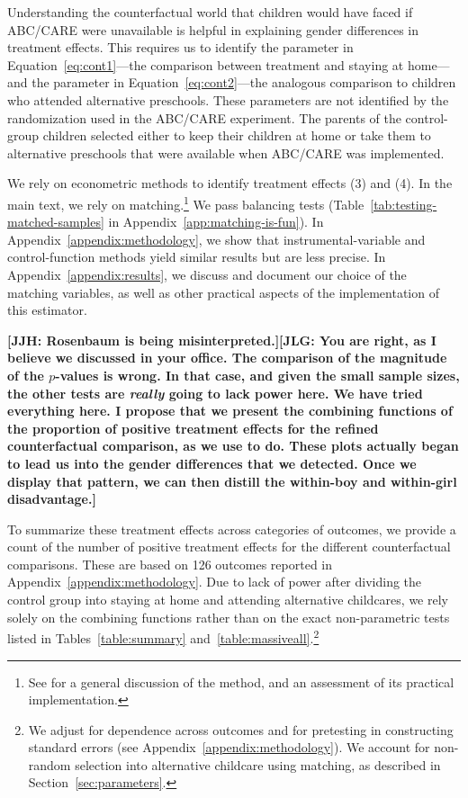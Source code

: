 
Understanding the counterfactual world that children would have faced if ABC/CARE were unavailable is helpful in explaining gender differences in treatment effects. This requires us to identify the parameter in Equation~\eqref{eq:cont1}---the comparison between treatment and staying at home---and the parameter in Equation~\eqref{eq:cont2}---the analogous comparison to children who attended alternative preschools. These parameters are not identified by the randomization used in the ABC/CARE experiment. The parents of the control-group children selected either to keep their children at home or take them to alternative preschools that were available when ABC/CARE was implemented.

We rely on econometric methods to identify treatment effects (3) and (4). In the main text, we rely on matching.\footnote{See \citet{Heckman_Ichimura_etal_1998_REStud} for a general discussion of the method, and an assessment of its practical implementation.} We pass balancing tests (Table~\ref{tab:testing-matched-samples} in Appendix~\ref{app:matching-is-fun}). In Appendix~\ref{appendix:methodology}, we show that instrumental-variable and control-function methods yield similar results but are less precise. In Appendix~\ref{appendix:results}, we discuss and document our choice of the matching variables, as well as other practical aspects of the implementation of this estimator.

\textbf{[JJH: Rosenbaum is being misinterpreted.][JLG: You are right, as I believe we discussed in your office. The comparison of the magnitude of the $p$-values is wrong. In that case, and given the small sample sizes, the other tests are \textit{really} going to lack power here. We have tried everything here. I propose that we present the combining functions of the proportion of positive treatment effects for the refined counterfactual comparison, as we use to do. These plots actually began to lead us into the gender differences that we detected. Once we display that pattern, we can then distill the within-boy and within-girl disadvantage.]}

To summarize these treatment effects across categories of outcomes, we provide a count of the number of positive treatment effects for the different counterfactual comparisons. These are based on 126 outcomes reported in Appendix~\ref{appendix:methodology}. Due to lack of power after dividing the control group into staying at home and attending alternative childcares, we rely solely on the combining functions rather than on the exact non-parametric tests listed in Tables~\ref{table:summary} and~\ref{table:massiveall}.\footnote{We adjust for dependence across outcomes and for pretesting in constructing standard errors (see Appendix~\ref{appendix:methodology}). We account for non-random selection into alternative childcare using matching, as described in Section~\ref{sec:parameters}.}

